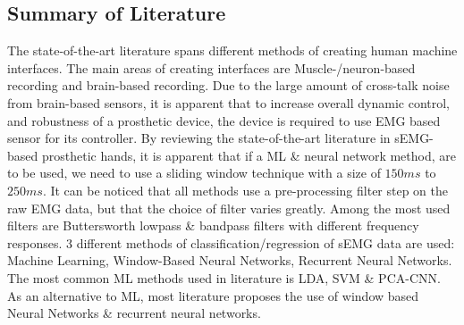 \documentclass[../main.tex]{subfiles}
\begin{document}


\subsection{Summary of Literature}

The state-of-the-art literature spans different methods of creating human machine interfaces.
The main areas of creating interfaces are Muscle-/neuron-based recording and brain-based recording.
Due to the large amount of cross-talk noise from brain-based sensors, it is apparent that to increase overall dynamic control, and robustness of a prosthetic device, the device is required to use EMG based sensor for its controller.
By reviewing the state-of-the-art literature in sEMG-based prosthetic hands, it is apparent that if a \gls{ML} \& neural network method, are to be used, we need to use a sliding window technique with a size of $150ms$ to $250ms$.
It can be noticed that all methods use a pre-processing filter step on the raw EMG data, but that the choice of filter varies greatly.
Among the most used filters are Buttersworth lowpass \& bandpass filters with different frequency responses.
3 different methods of classification/regression of sEMG data are used: Machine Learning, Window-Based Neural Networks, Recurrent Neural Networks.
The most common ML methods used in literature is \gls{LDA}, \gls{SVM} \& PCA-CNN.
As an alternative to ML, most literature proposes the use of window based Neural Networks \& recurrent neural networks.
\end{document}
